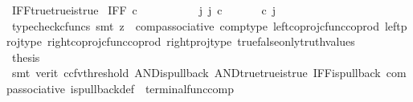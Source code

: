 \begin{isabellebody}
\isamarkupfalse%
\ IFF{\isacharunderscore}{\kern0pt}true{\isacharunderscore}{\kern0pt}true{\isacharunderscore}{\kern0pt}is{\isacharunderscore}{\kern0pt}true{\isacharcolon}{\kern0pt}\isanewline
\ {\isachardoublequoteopen}IFF\ {\isasymcirc}\isactrlsub c\ {\isasymlangle}{\isasymt}{\isacharcomma}{\kern0pt}{\isasymt}{\isasymrangle}\ {\isacharequal}{\kern0pt}\ {\isasymt}{\isachardoublequoteclose}\isanewline
%
\isadelimproof
%
\endisadelimproof
%
\isatagproof
{}\isamarkupfalse%
\ {\isacharminus}{\kern0pt}\ \isanewline
\ \ \isamarkupfalse%
\ {\isachardoublequoteopen}{\isasymexists}\ j{\isachardot}{\kern0pt}\ j\ {\isasymin}\isactrlsub c\ {\isacharparenleft}{\kern0pt}{\isasymone}{\isasymCoprod}{\isasymone}{\isacharparenright}{\kern0pt}\ {\isasymand}\ {\isacharparenleft}{\kern0pt}{\isasymlangle}{\isasymt}{\isacharcomma}{\kern0pt}\ {\isasymt}{\isasymrangle}\ {\isasymamalg}{\isasymlangle}{\isasymf}{\isacharcomma}{\kern0pt}\ {\isasymf}{\isasymrangle}{\isacharparenright}{\kern0pt}\ {\isasymcirc}\isactrlsub c\ j\ \ {\isacharequal}{\kern0pt}\ {\isasymlangle}{\isasymt}{\isacharcomma}{\kern0pt}{\isasymt}{\isasymrangle}{\isachardoublequoteclose}\isanewline
\ \ \ \ \isamarkupfalse%
\ {\isacharparenleft}{\kern0pt}typecheck{\isacharunderscore}{\kern0pt}cfuncs{\isacharcomma}{\kern0pt}\ smt\ {\isacharparenleft}{\kern0pt}z{}{\isacharparenright}{\kern0pt}\ \ comp{\isacharunderscore}{\kern0pt}associative{}\ comp{\isacharunderscore}{\kern0pt}type\ left{\isacharunderscore}{\kern0pt}coproj{\isacharunderscore}{\kern0pt}cfunc{\isacharunderscore}{\kern0pt}coprod\ left{\isacharunderscore}{\kern0pt}proj{\isacharunderscore}{\kern0pt}type\ right{\isacharunderscore}{\kern0pt}coproj{\isacharunderscore}{\kern0pt}cfunc{\isacharunderscore}{\kern0pt}coprod\ right{\isacharunderscore}{\kern0pt}proj{\isacharunderscore}{\kern0pt}type\ true{\isacharunderscore}{\kern0pt}false{\isacharunderscore}{\kern0pt}only{\isacharunderscore}{\kern0pt}truth{\isacharunderscore}{\kern0pt}values{\isacharparenright}{\kern0pt}\isanewline
\ \ \isamarkupfalse%
\ \isamarkupfalse%
\ {\isacharquery}{\kern0pt}thesis\ \isanewline
\ \ \ \ \isamarkupfalse%
\ {\isacharparenleft}{\kern0pt}smt\ {\isacharparenleft}{\kern0pt}verit{\isacharcomma}{\kern0pt}\ ccfv{\isacharunderscore}{\kern0pt}threshold{\isacharparenright}{\kern0pt}\ AND{\isacharunderscore}{\kern0pt}is{\isacharunderscore}{\kern0pt}pullback\ AND{\isacharunderscore}{\kern0pt}true{\isacharunderscore}{\kern0pt}true{\isacharunderscore}{\kern0pt}is{\isacharunderscore}{\kern0pt}true\ IFF{\isacharunderscore}{\kern0pt}is{\isacharunderscore}{\kern0pt}pullback\ comp{\isacharunderscore}{\kern0pt}associative{}\ is{\isacharunderscore}{\kern0pt}pullback{\isacharunderscore}{\kern0pt}def\ \ terminal{\isacharunderscore}{\kern0pt}func{\isacharunderscore}{\kern0pt}comp{\isacharparenright}{\kern0pt}\isanewline

\end{isabellebody}
